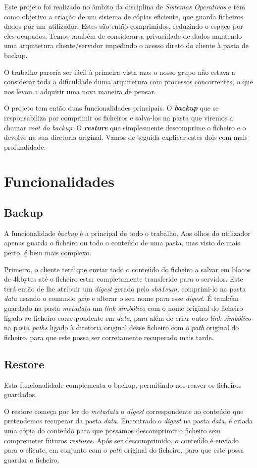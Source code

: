 \documentclass[12pt,a4paper]{report}
\begin{document}
Este projeto foi realizado no âmbito da disciplina de \emph{Sistemas Operativos} e tem como objetivo a criação de um sistema de cópias eficiente, que guarda ficheiros dados por um utilizador. Estes são então comprimidos, reduzindo o espaço por eles ocupados. Temos também de considerar a privacidade de dados mantendo uma arquitetura cliente/servidor impedindo o acesso direto do cliente à pasta de backup.\par
O trabalho parecia ser fácil à primeira vista mas o nosso grupo não estava a considerar toda a dificuldade duma arquitetura com processos concorrentes, o que nos levou a adquirir uma nova maneira de pensar.\par
O projeto tem então duas funcionalidades principais. O \emph{\bfseries{backup}} que se responsabiliza por comprimir os ficheiros e salva-los na pasta que viremos a chamar \emph{root do backup}. O \emph{\bfseries{restore}} que simplesmente descomprime o ficheiro e o devolve na sua diretoria original. Vamos de seguida explicar estes dois com mais profundidade.

\chapter{Funcionalidades}
\section{Backup}
A funcionalidade \emph{backup} é a principal de todo o trabalho. Aos olhos do utilizador apenas guarda o ficheiro ou todo o conteúdo de uma pasta, mas visto de mais perto, é bem mais complexo.\par Primeiro, o cliente terá que enviar todo o conteúdo do ficheiro a salvar em blocos de 4kbytes até o ficheiro estar completamente transferido para o servidor. Este terá então de lhe atribuir um \emph{digest} gerado pelo \emph{sha1sum}, comprimi-lo na pasta \emph{data}  usando o comando \emph{gzip} e alterar o seu nome para esse \emph{digest}. É também guardado na pasta \emph{metadata} um \emph{link simbólico} com o nome original do ficheiro ligado ao ficheiro correspondente em \emph{data}, para além de criar outro \emph{link simbólico} na pasta \emph{paths} ligado à diretoria original desse ficheiro com o \emph{path} original do ficheiro, para que este possa ser corretamente recuperado mais tarde.

\section{Restore}
Esta funcionalidade complementa o backup, permitindo-nos reaver os ficheiros guardados.\par O restore começa por ler do \emph{metadata} o \emph{digest} correspondente ao conteúdo que pretendemos recuperar da pasta \emph{data}. Encontrado o \emph{digest} na pasta \emph{data}, é criada uma cópia do conteúdo para que possamos descomprimir o ficheiro sem compremeter futuros \emph{restores}. Após ser descomprimido, o conteúdo é enviado para o cliente, em conjunto com o \emph{path} original do ficheiro, para que este possa guardar o ficheiro.
\end{document}
